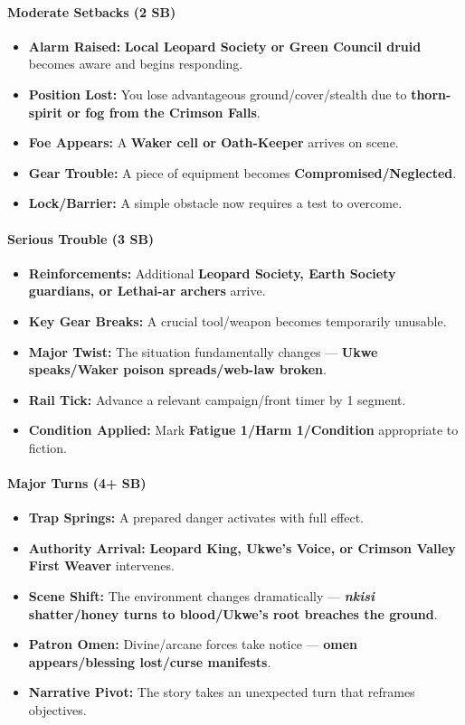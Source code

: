 \paragraph{Moderate Setbacks (2 SB)}
\begin{itemize}
\item \textbf{Alarm Raised:} \textbf{Local Leopard Society or Green Council druid} becomes aware and begins responding.
\item \textbf{Position Lost:} You lose advantageous ground/cover/stealth due to \textbf{thorn-spirit or fog from the Crimson Falls}.
\item \textbf{Foe Appears:} A \textbf{Waker cell or Oath-Keeper} arrives on scene.
\item \textbf{Gear Trouble:} A piece of equipment becomes \textbf{Compromised/Neglected}.
\item \textbf{Lock/Barrier:} A simple obstacle now requires a test to overcome.
\end{itemize}

\paragraph{Serious Trouble (3 SB)}
\begin{itemize}
\item \textbf{Reinforcements:} Additional \textbf{Leopard Society, Earth Society guardians, or Lethai-ar archers} arrive.
\item \textbf{Key Gear Breaks:} A crucial tool/weapon becomes temporarily unusable.
\item \textbf{Major Twist:} The situation fundamentally changes --- \textbf{Ukwe speaks/Waker poison spreads/web-law broken}.
\item \textbf{Rail Tick:} Advance a relevant campaign/front timer by 1 segment.
\item \textbf{Condition Applied:} Mark \textbf{Fatigue 1/Harm 1/Condition} appropriate to fiction.
\end{itemize}

\paragraph{Major Turns (4+ SB)}
\begin{itemize}
\item \textbf{Trap Springs:} A prepared danger activates with full effect.
\item \textbf{Authority Arrival:} \textbf{Leopard King, Ukwe's Voice, or Crimson Valley First Weaver} intervenes.
\item \textbf{Scene Shift:} The environment changes dramatically --- \textbf{\textit{nkisi} shatter/honey turns to blood/Ukwe's root breaches the ground}.
\item \textbf{Patron Omen:} Divine/arcane forces take notice --- \textbf{omen appears/blessing lost/curse manifests}.
\item \textbf{Narrative Pivot:} The story takes an unexpected turn that reframes objectives.
\end{itemize}

